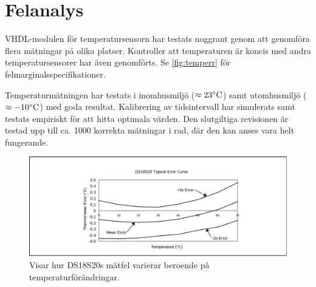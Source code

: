 \section{Felanalys}
VHDL-modulen för temperatursensorn har testats noggrant genom att genomföra flera mätningar på olika platser.
Kontroller att temperaturen är koncis med andra temperatursensorer har även genomförts. Se \autoref{fig:temperr} för felmarginalsspecifikationer.

Temperaturmätningen har testats i inomhusmiljö ($\approx 23^\circ\mathrm{C}$) samt utomhusmiljö ($\approx -10^\circ\mathrm{C}$) med goda resultat.
Kalibrering av tidsintervall har simulerats samt testats empiriskt för att hitta optimala värden. Den slutgiltiga revisionen är testad upp till ca. 1000 korrekta mätningar i rad, där den kan anses vara helt fungerande.


\begin{figure}[htp]
\centering
\includegraphics[width=\textwidth]{temp_error.pdf}
\caption{Visar hur DS18S20s mätfel varierar beroende på temperaturförändringar.}
\label{fig:temperr}
\end{figure}